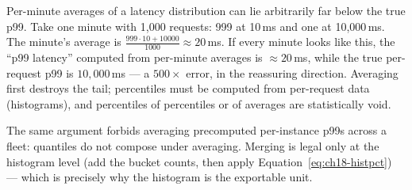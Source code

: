 \begin{proposition}
\label{prop:ch18-p99avg}
Per-minute averages of a latency distribution can lie arbitrarily far below
the true p99. Take one minute with 1{,}000 requests: 999 at 10\,ms and one
at 10{,}000\,ms. The minute's average is
$\frac{999 \cdot 10 + 10000}{1000} \approx 20$\,ms. If every minute looks
like this, the ``p99 latency'' computed from per-minute averages is
$\approx 20$\,ms, while the true per-request p99 is $10{,}000$\,ms ---
a $500\times$ error, in the reassuring direction. Averaging first destroys
the tail; percentiles must be computed from per-request data (histograms),
and percentiles of percentiles or of averages are statistically void.
\end{proposition}

The same argument forbids averaging precomputed per-instance p99s across a
fleet: quantiles do not compose under averaging. Merging is legal only at
the histogram level (add the bucket counts, then apply
Equation~\eqref{eq:ch18-histpct}) --- which is precisely why the histogram
is the exportable unit.


